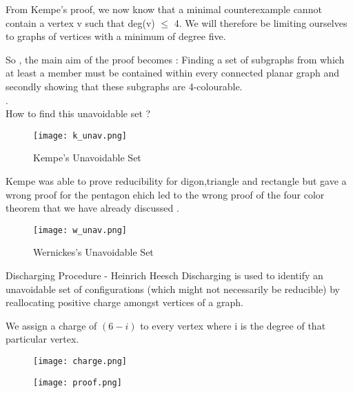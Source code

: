 \documentclass[12pt]{beamer}
\begin{document}
\begin{frame}
From Kempe’s proof, we now know that a minimal counterexample cannot
contain a vertex v such that deg(v) $\leq$ 4. We will therefore be limiting ourselves to graphs of vertices with a minimum of degree five.
\end{frame}

\begin{frame}
So , the main aim of the proof becomes :
Finding a set of subgraphs from which
at least a member must be contained within every connected planar graph and secondly showing that these subgraphs are 4-colourable.\\
.\\
\Large{How to find this unavoidable set ?}
\end{frame}

\begin{frame}
\begin{figure}
\texttt{[image: k\_unav.png]}
\caption{Kempe's Unavoidable Set}
\end{figure}

Kempe was able to prove reducibility for digon,triangle and rectangle but gave a wrong proof for the pentagon ehich led to the wrong proof of the four color theorem that we have already discussed .
\end{frame}

\begin{frame}
\begin{figure}
\texttt{[image: w\_unav.png]}
\caption{Wernickes's Unavoidable Set}
\end{figure}
\end{frame}

\begin{frame}{Discharging Procedure - Heinrich Heesch}
Discharging is used to identify an unavoidable set of configurations (which might not necessarily be reducible) by reallocating positive charge amongst vertices of a graph.
\end{frame}

\begin{frame}
We assign a charge of $(6 - i)$ to every vertex where i is the degree of that particular vertex. 
\begin{figure}
\texttt{[image: charge.png]}
\end{figure}
\end{frame}

\begin{frame}
\begin{figure}
\texttt{[image: proof.png]}
\end{figure}
\end{frame}
\end{document}
